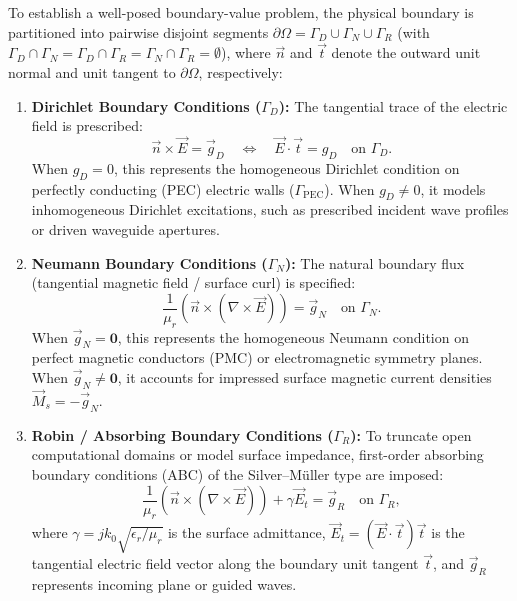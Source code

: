 \documentclass[preprint,12pt]{elsarticle}
\begin{document}
To establish a well-posed boundary-value problem, the physical boundary is partitioned into pairwise disjoint segments $\partial\Omega = \Gamma_D \cup \Gamma_N \cup \Gamma_R$ (with $\Gamma_D \cap \Gamma_N = \Gamma_D \cap \Gamma_R = \Gamma_N \cap \Gamma_R = \emptyset$), where $\vec{n}$ and $\vec{t}$ denote the outward unit normal and unit tangent to $\partial\Omega$, respectively:
\begin{enumerate}
    \item \textbf{Dirichlet Boundary Conditions ($\Gamma_D$):} The tangential trace of the electric field is prescribed:
          \begin{equation}
              \vec{n} \times \vec{E} = \vec{g}_D \quad \iff \quad \vec{E} \cdot \vec{t} = g_D \quad \text{on } \Gamma_D.
              \label{eq:pec_bc}
          \end{equation}
          When $g_D = 0$, this represents the homogeneous Dirichlet condition on perfectly conducting (PEC) electric walls ($\Gamma_{\mathrm{PEC}}$). When $g_D \ne 0$, it models inhomogeneous Dirichlet excitations, such as prescribed incident wave profiles or driven waveguide apertures.
    \item \textbf{Neumann Boundary Conditions ($\Gamma_N$):} The natural boundary flux (tangential magnetic field / surface curl) is specified:
          \begin{equation}
              \frac{1}{\mu_r} \left(\vec{n} \times (\nabla \times \vec{E})\right) = \vec{g}_N \quad \text{on } \Gamma_N.
              \label{eq:neumann_bvp_pde}
          \end{equation}
          When $\vec{g}_N = \mathbf{0}$, this represents the homogeneous Neumann condition on perfect magnetic conductors (PMC) or electromagnetic symmetry planes. When $\vec{g}_N \ne \mathbf{0}$, it accounts for impressed surface magnetic current densities $\vec{M}_s = -\vec{g}_N$.
    \item \textbf{Robin / Absorbing Boundary Conditions ($\Gamma_R$):} To truncate open computational domains or model surface impedance, first-order absorbing boundary conditions (ABC) of the Silver--M{\"u}ller type are imposed:
          \begin{equation}
              \frac{1}{\mu_r} \left(\vec{n} \times (\nabla \times \vec{E})\right) + \gamma \vec{E}_t = \vec{g}_R \quad \text{on } \Gamma_R,
              \label{eq:robin_bvp_pde}
          \end{equation}
          where $\gamma = j k_0 \sqrt{\epsilon_r / \mu_r}$ is the surface admittance, $\vec{E}_t = (\vec{E} \cdot \vec{t})\vec{t}$ is the tangential electric field vector along the boundary unit tangent $\vec{t}$, and $\vec{g}_R$ represents incoming plane or guided waves.
\end{enumerate}
\end{document}
